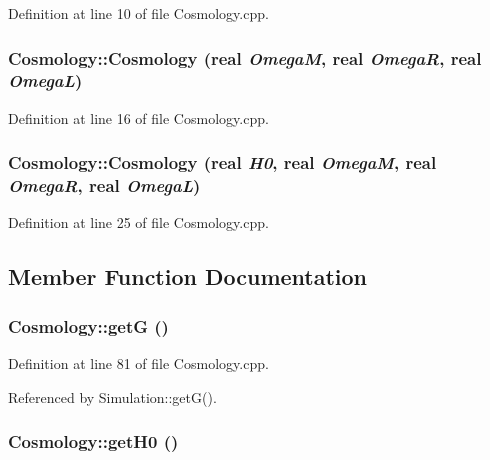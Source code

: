 Definition at line 10 of file Cosmology.cpp.

\subsubsection[{Cosmology}]{\setlength{\rightskip}{0pt plus 5cm}Cosmology::Cosmology ({\bf real} {\em OmegaM}, \/  {\bf real} {\em OmegaR}, \/  {\bf real} {\em OmegaL})}\label{classCosmology_aeba46061f992fb98aa923cc8b32df880}


Definition at line 16 of file Cosmology.cpp.

\subsubsection[{Cosmology}]{\setlength{\rightskip}{0pt plus 5cm}Cosmology::Cosmology ({\bf real} {\em H0}, \/  {\bf real} {\em OmegaM}, \/  {\bf real} {\em OmegaR}, \/  {\bf real} {\em OmegaL})}\label{classCosmology_a851b79b6de150af41af3b91485c1c338}


Definition at line 25 of file Cosmology.cpp.



\subsection{Member Function Documentation}
\subsubsection[{getG}]{ Cosmology::getG ()}\label{classCosmology_a0b9e83975c4d1109c58f1b1584678db2}


Definition at line 81 of file Cosmology.cpp.



Referenced by Simulation::getG().

\subsubsection[{getH0}]{ Cosmology::getH0 ()}\label{classCosmology_adb3b68e5a216361a6ad1b2f73e8d7afd}


